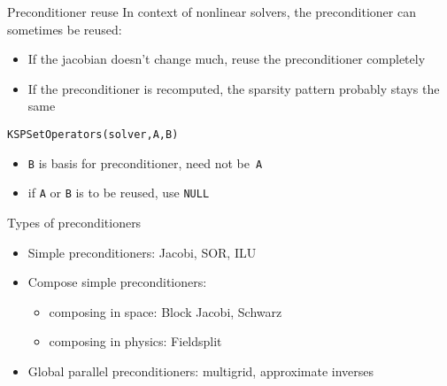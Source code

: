 \begin{longversion}
\begin{numberedframe}{Preconditioner reuse}
In context of nonlinear solvers, the preconditioner can sometimes be reused:
\begin{itemize}
\item If the jacobian doesn't change much, reuse the preconditioner completely
\item If the preconditioner is recomputed, the sparsity pattern 
  probably stays the same
\end{itemize}
\lstinline{KSPSetOperators(solver,A,B)}
    \begin{itemize}
    \item \lstinline{B} is basis for preconditioner, need not be~\lstinline{A}
    \item if \lstinline{A} or \lstinline{B} is to be reused, use \lstinline{NULL}
    \end{itemize}
\end{numberedframe}

\begin{numberedframe}{Types of preconditioners}
  \begin{itemize}
  \item Simple preconditioners: Jacobi, SOR, ILU
  \item Compose simple preconditioners:
    \begin{itemize}
    \item composing in space: Block Jacobi, Schwarz
    \item composing in physics: Fieldsplit
    \end{itemize}
  \item Global parallel preconditioners: multigrid, approximate
    inverses
  \end{itemize}
\end{numberedframe}


\end{longversion}
